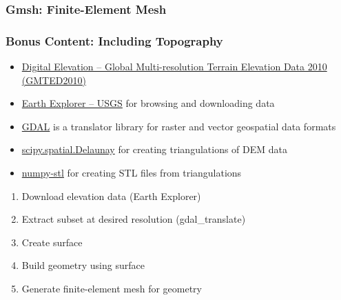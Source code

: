 \documentclass[aspectratio=169]{beamer}
\begin{document}
\begin{frame}
  \frametitle{Gmsh: Finite-Element Mesh}

  
\end{frame}


\begin{frame}
  \frametitle{Bonus Content: Including Topography}
  \summary{}

  \begin{itemize}
    \begin{itemize}
      \item \href{https://www.usgs.gov/centers/eros/science/usgs-eros-archive-digital-elevation-global-multi-resolution-terrain-elevation}{Digital Elevation -- Global Multi-resolution Terrain Elevation Data 2010 (GMTED2010)}
    \item \href{https://earthexplorer.usgs.gov/}{Earth Explorer -- USGS} for browsing and downloading data
    \item \href{https://gdal.org}{GDAL} is a translator library for raster and vector geospatial data formats
    \item \href{https://docs.scipy.org/doc/scipy/reference/generated/scipy.spatial.Delaunay.html}{scipy.spatial.Delaunay} for creating triangulations of DEM data
    \item \href{https://numpy-stl.readthedocs.io/en/latest/usage.html}{numpy-stl} for creating STL files from triangulations
    \end{itemize}\pause
    \begin{enumerate}
    \item Download elevation data (Earth Explorer)
    \item Extract subset at desired resolution ({\ttfamily gdal\_translate})
    \item Create surface
    \item Build geometry using surface
    \item Generate finite-element mesh for geometry
    \end{enumerate}
  \end{itemize}

\end{frame}
\end{document}
